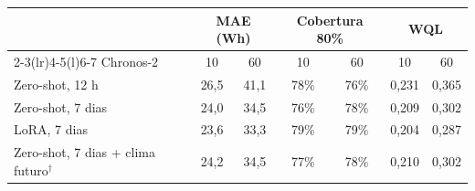 \begin{tabular}{@{}lcccccc@{}}
\toprule
 & \multicolumn{2}{c}{MAE (Wh)} & \multicolumn{2}{c}{Cobertura 80\%} & \multicolumn{2}{c}{WQL} \\
\cmidrule(lr){2-3}\cmidrule(lr){4-5}\cmidrule(l){6-7}
Chronos-2 & 10 & 60 & 10 & 60 & 10 & 60 \\
\midrule
Zero-shot, 12 h & 26,5 & 41,1 & 78\% & 76\% & 0,231 & 0,365 \\
Zero-shot, 7 dias & 24,0 & 34,5 & 76\% & 78\% & 0,209 & 0,302 \\
LoRA, 7 dias & 23,6 & 33,3 & 79\% & 79\% & 0,204 & 0,287 \\
Zero-shot, 7 dias + clima futuro$^\dagger$ & 24,2 & 34,5 & 77\% & 78\% & 0,210 & 0,302 \\
\bottomrule
\end{tabular}
